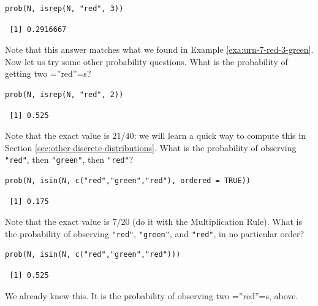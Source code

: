 \documentclass[captions=tableheading]{scrbook}
\begin{document}
\begin{verbatim}
prob(N, isrep(N, "red", 3))
\end{verbatim}

\begin{verbatim}
 [1] 0.2916667
\end{verbatim}

Note that this answer matches what we found in Example \ref{exa:urn-7-red-3-green}. Now let us try some other probability questions. What is the probability of getting two =''red''=s?


\begin{verbatim}
prob(N, isrep(N, "red", 2))
\end{verbatim}

\begin{verbatim}
 [1] 0.525
\end{verbatim}

Note that the exact value is \(21/40\); we will learn a quick way to compute this in Section \ref{sec:other-discrete-distributions}. What is the probability of observing \texttt{"red"}, then \texttt{"green"}, then \texttt{"red"}?


\begin{verbatim}
prob(N, isin(N, c("red","green","red"), ordered = TRUE))
\end{verbatim}

\begin{verbatim}
 [1] 0.175
\end{verbatim}

Note that the exact value is \(7/20\) (do it with the Multiplication Rule). What is the probability of observing \texttt{"red"}, \texttt{"green"}, and \texttt{"red"}, in no particular order?


\begin{verbatim}
prob(N, isin(N, c("red","green","red")))
\end{verbatim}

\begin{verbatim}
 [1] 0.525
\end{verbatim}

We already knew this. It is the probability of observing two =''red''=s, above.
\end{document}
